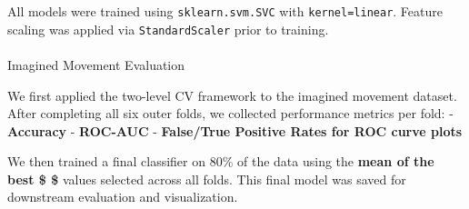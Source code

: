 \documentclass[
  letterpaper,
  DIV=11,
  numbers=noendperiod]{scrartcl}
\makeatletter
\let\oldparagraph\paragraph
\renewcommand{\paragraph}{
    \@ifstar
      \xxxParagraphStar
      \xxxParagraphNoStar
  }
\newcommand{\xxxParagraphStar}[1]{\oldparagraph*{#1}\mbox{}}
\newcommand{\xxxParagraphNoStar}[1]{\oldparagraph{#1}\mbox{}}
\makeatother
\begin{document}
All models were trained using \texttt{sklearn.svm.SVC} with
\texttt{kernel=\textquotesingle{}linear\textquotesingle{}}. Feature
scaling was applied via \texttt{StandardScaler} prior to training.

\paragraph{Imagined Movement
Evaluation}\label{imagined-movement-evaluation}

We first applied the two-level CV framework to the imagined movement
dataset. After completing all six outer folds, we collected performance
metrics per fold: - \textbf{Accuracy} - \textbf{ROC-AUC} -
\textbf{False/True Positive Rates for ROC curve plots}

We then trained a final classifier on 80\% of the data using the
\textbf{mean of the best \$ \alpha \$} values selected across all folds.
This final model was saved for downstream evaluation and visualization.
\end{document}
